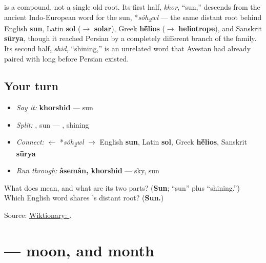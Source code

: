 \begin{cousinweb}
\textbf{} is a compound, not a single old root. Its first half, \textbf{} \emph{khor}, \textquotedblleft{}sun,\textquotedblright{} descends from the ancient Indo-European word for the sun, *\emph{sóh\textsubscript{2}wl} — the same distant root behind English \textbf{sun}, Latin \textbf{sol} ($\to$ \textbf{solar}), Greek \textbf{h\'{\={e}}lios} ($\to$ \textbf{heliotrope}), and Sanskrit \textbf{sūrya}, though it reached Persian by a completely different branch of the family. Its second half, \textbf{} \emph{shid}, \textquotedblleft{}shining,\textquotedblright{} is an unrelated word that Avestan had already paired with \textbf{} long before Persian existed.
\end{cousinweb}

\subsection*{Your turn}
\begin{itemize}
\raggedright
  \item \emph{Say it:} \textbf{khorshid} — sun
  \item \emph{Split:} \textbf{}, sun — \textbf{}, shining
  \item \emph{Connect:} \textbf{} $\leftarrow$ *\emph{sóh\textsubscript{2}wl} $\to$ English \textbf{sun}, Latin \textbf{sol}, Greek \textbf{h\'{\={e}}lios}, Sanskrit \textbf{sūrya}
  \item \emph{Run through:} \textbf{âsemân, khorshid} — sky, sun
\end{itemize}

\begin{tcolorbox}[breakable,colback=teal!4,colframe=teal!35!black,title={Before you move on}]
What does \textbf{} mean, and what are its two parts? (\textbf{Sun}; \textbf{} \textquotedblleft{}sun\textquotedblright{} plus \textbf{} \textquotedblleft{}shining.\textquotedblright{}) Which English word shares \textbf{}'s distant root? (\textbf{Sun.})

Source: \href{https://en.wiktionary.org/wiki/\%D8\%AE\%D9\%88\%D8\%B1\%D8\%B4\%DB\%8C\%D8\%AF}{Wiktionary: }.
\end{tcolorbox}
\section[\texorpdfstring{\fa{ماه} (mâh)}{ماه (mâh)}]{ — moon, and month}

